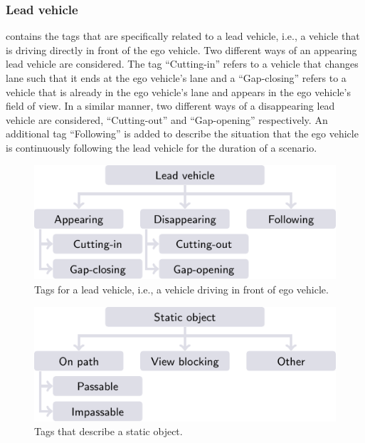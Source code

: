 \subsubsection{Lead vehicle}
\label{sec:lead vehicle}

 contains the tags that are specifically related to a lead vehicle, i.e., a vehicle that is driving directly in front of the ego vehicle. Two different ways of an appearing lead vehicle are considered. The tag ``Cutting-in'' refers to a vehicle that changes lane such that it ends at the ego vehicle's lane and a ``Gap-closing'' refers to a vehicle that is already in the ego vehicle's lane and appears in the ego vehicle's field of view. In a similar manner, two different ways of a disappearing lead vehicle are considered, ``Cutting-out'' and ``Gap-opening'' respectively. An additional tag ``Following'' is added to describe the situation that the ego vehicle is continuously following the lead vehicle for the duration of a scenario.

\begin{figure}
	\centering
	\includegraphics{figures/lead_vehicle}
	\caption{Tags for a lead vehicle, i.e., a vehicle driving in front of ego vehicle.}
	\label{fig:tree lead vehicle}
\end{figure}

\begin{figure}
	\centering
	\includegraphics{figures/static_object}
	\caption{Tags that describe a static object.}
	\label{fig:tree static object}
\end{figure}



